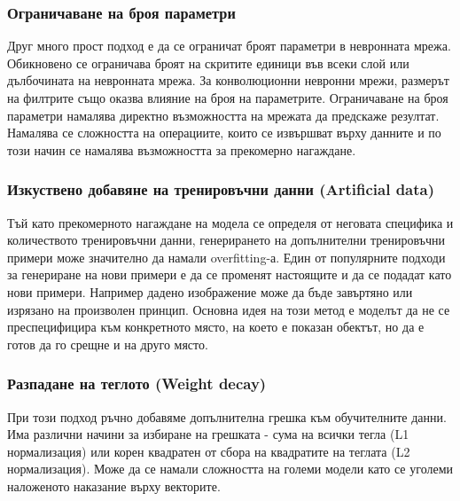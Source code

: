 \subsubsection{Ограничаване на броя параметри}
Друг много прост подход е да се ограничат броят параметри в невронната мрежа. Обикновено се ограничава броят на скритите единици във всеки слой или дълбочината на невронната мрежа. За конволюционни невронни мрежи, размерът на филтрите също оказва влияние на броя на параметрите. Ограничаване на броя параметри намалява директно възможността на мрежата да предскаже резултат. Намалява се сложността на операциите, които се извършват върху данните и по този начин се намалява възможността за прекомерно нагаждане.

\subsubsection{Изкуствено добавяне на тренировъчни данни (Artificial data)}
Тъй като прекомерното нагаждане на модела се определя от неговата специфика и количеството тренировъчни данни, генерирането на допълнителни тренировъчни примери може значително да намали overfitting-а. Един от популярните подходи за генериране на нови примери е да се променят настоящите и да се подадат като нови примери. Например дадено изображение може да бъде завъртяно или изрязано на произволен принцип. Основна идея на този метод е моделът да не се преспецифицира към конкретното място, на което е показан обектът, но да е готов да го срещне и на друго място.

\subsubsection{Разпадане на теглото (Weight decay)}
При този подход ръчно добавяме допълнителна грешка към обучителните данни. Има различни начини за избиране на грешката - сума на всички тегла (L1 нормализация) или корен квадратен от сбора на квадратите на теглата (L2 нормализация). Може да се намали сложността на големи модели като се уголеми наложеното наказание върху векторите.

